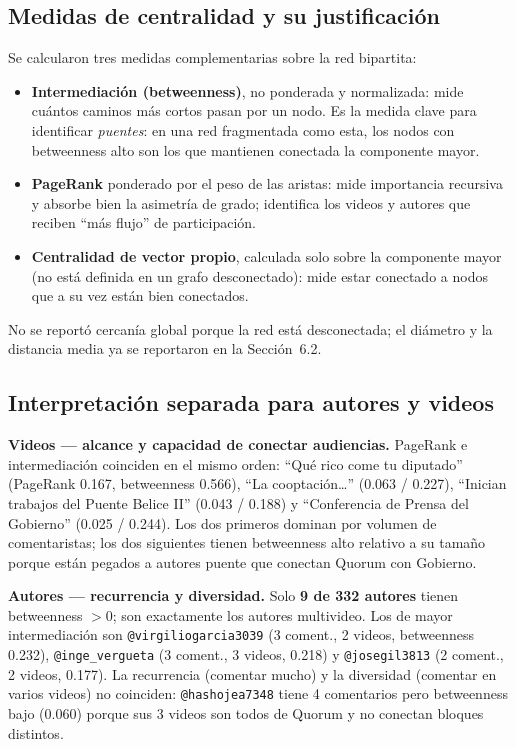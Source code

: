 \documentclass[11pt,a4paper]{article}
\begin{document}
\subsection{Medidas de centralidad y su justificaci\'on}
Se calcularon tres medidas complementarias sobre la red bipartita:
\begin{itemize}[leftmargin=1.4em,itemsep=2pt]
\item \textbf{Intermediaci\'on (betweenness)}, no ponderada y normalizada: mide cu\'antos caminos
m\'as cortos pasan por un nodo. Es la medida clave para identificar \emph{puentes}: en una red
fragmentada como esta, los nodos con betweenness alto son los que mantienen conectada la componente
mayor.
\item \textbf{PageRank} ponderado por el peso de las aristas: mide importancia recursiva y absorbe
bien la asimetr\'ia de grado; identifica los videos y autores que reciben ``m\'as flujo'' de
participaci\'on.
\item \textbf{Centralidad de vector propio}, calculada solo sobre la componente mayor (no est\'a
definida en un grafo desconectado): mide estar conectado a nodos que a su vez est\'an bien conectados.
\end{itemize}
No se report\'o cercan\'ia global porque la red est\'a desconectada; el di\'ametro y la distancia media
ya se reportaron en la Secci\'on~6.2.

\subsection{Interpretaci\'on separada para autores y videos}
\textbf{Videos --- alcance y capacidad de conectar audiencias.} PageRank e intermediaci\'on coinciden
en el mismo orden: ``Qu\'e rico come tu diputado'' (PageRank 0.167, betweenness 0.566), ``La
cooptaci\'on\dots'' (0.063 / 0.227), ``Inician trabajos del Puente Belice II'' (0.043 / 0.188) y
``Conferencia de Prensa del Gobierno'' (0.025 / 0.244). Los dos primeros dominan por volumen de
comentaristas; los dos siguientes tienen betweenness alto relativo a su tama\~no porque est\'an
pegados a autores puente que conectan Quorum con Gobierno.

\textbf{Autores --- recurrencia y diversidad.} Solo \textbf{9 de 332 autores} tienen betweenness $>0$;
son exactamente los autores multivideo. Los de mayor intermediaci\'on son \texttt{@virgiliogarcia3039}
(3 coment., 2 videos, betweenness 0.232), \texttt{@inge\_vergueta} (3 coment., 3 videos, 0.218) y
\texttt{@josegil3813} (2 coment., 2 videos, 0.177). La recurrencia (comentar mucho) y la diversidad
(comentar en varios videos) no coinciden: \texttt{@hashojea7348} tiene 4 comentarios pero betweenness
bajo (0.060) porque sus 3 videos son todos de Quorum y no conectan bloques distintos.
\end{document}
